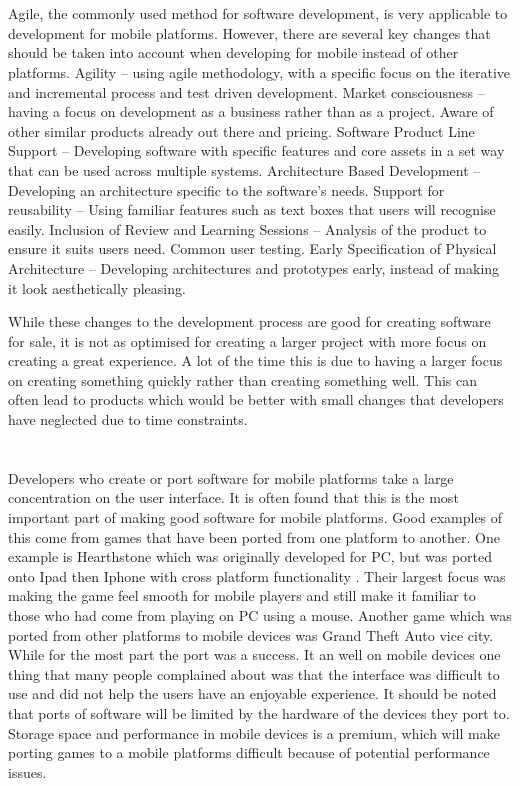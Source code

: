\documentclass{scrartcl}
\begin{document}
\section{}
\cite{mobileAgility}
Agile, the commonly used method for software development, is very applicable to development for mobile platforms. However, there are several key changes that should be taken into account when developing for mobile instead of other platforms.
 Agility – using agile methodology, with a specific focus on the iterative and incremental process and test driven development. 
Market consciousness – having a focus on development as a business rather than as a project. Aware of other similar products already out there and pricing.
Software Product Line Support – Developing software with specific features and core assets in a set way that can be used across multiple systems. 
Architecture Based Development – Developing an architecture specific to the software’s needs. 
Support for reusability – Using familiar features such as text boxes that users will recognise easily. 
Inclusion of Review and Learning Sessions – Analysis of the product to ensure it suits users need. Common user testing.
Early Specification of Physical Architecture – Developing architectures and prototypes early, instead of making it look aesthetically pleasing.

While these changes to the development process are good for creating software for sale, it is not as optimised for creating a larger project with more focus on creating a great experience. A lot of the time this is due to having a larger focus on creating something quickly rather than creating something well. This can often lead to products which would be better with small changes that developers have neglected due to time constraints. 

\section{}
Developers who create or port software for mobile platforms take a large concentration on the user interface. It is often found that this is the most important part of making good software for mobile platforms. Good examples of this come from games that have been ported from one platform to another. One example is Hearthstone which was originally developed for PC, but was ported onto Ipad then Iphone with cross platform functionality \cite{design and development of hearthstone_2017}. Their largest focus was making the game feel smooth for mobile players and still make it familiar to those who had come from playing on PC using a mouse. Another game which was ported from other platforms to mobile devices was Grand Theft Auto vice city. While for the most part the port was a success. It an well on mobile devices one thing that many people complained about was that the interface was difficult to use and did not help the users have an enjoyable experience. \cite{rice_2012}
It should be noted that ports of software will be limited by the hardware of the devices they port to. Storage space and performance in mobile devices is a premium, which will make porting games to a mobile platforms difficult because of potential performance issues. 
\end{document}
